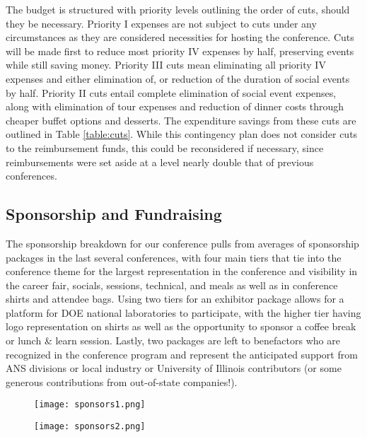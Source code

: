 The budget is structured with priority levels outlining the order of cuts, should they be necessary. Priority I expenses are not subject to cuts under any circumstances as they are considered necessities for hosting the conference. Cuts will be made first to reduce most priority IV expenses by half, preserving events while still saving money. Priority III cuts mean eliminating all priority IV expenses and either elimination of, or reduction of the duration of social events by half. Priority II cuts entail complete elimination of social event expenses, along with elimination of tour expenses and reduction of dinner costs through cheaper buffet options and desserts. The expenditure savings from these cuts are outlined in Table \ref{table:cuts}. While this contingency plan does not consider cuts to the reimbursement funds, this could be reconsidered if necessary, since reimbursements were set aside at a level nearly double that of previous conferences. 

\subsection{Sponsorship and Fundraising}
The sponsorship breakdown for our conference pulls from averages of sponsorship 
packages in the last several conferences, with four main tiers that tie into the conference theme for the largest representation in the conference and visibility in the career fair, socials, sessions, technical, and meals as well as in conference shirts and attendee bags. Using two tiers for an exhibitor package allows for a platform for DOE national laboratories to participate, with the higher tier having logo representation on shirts as well as the opportunity to sponsor a coffee break or lunch \& learn session. Lastly, two packages are left to benefactors who are recognized in the conference program and represent the anticipated support from ANS divisions or local industry or University of Illinois contributors (or some generous contributions from out-of-state companies!). 


\begin{figure}[H]
	\centering
	\texttt{[image: sponsors1.png]}	
\end{figure} 

\begin{figure}[H]
	\centering
	\texttt{[image: sponsors2.png]}	
\end{figure} 

